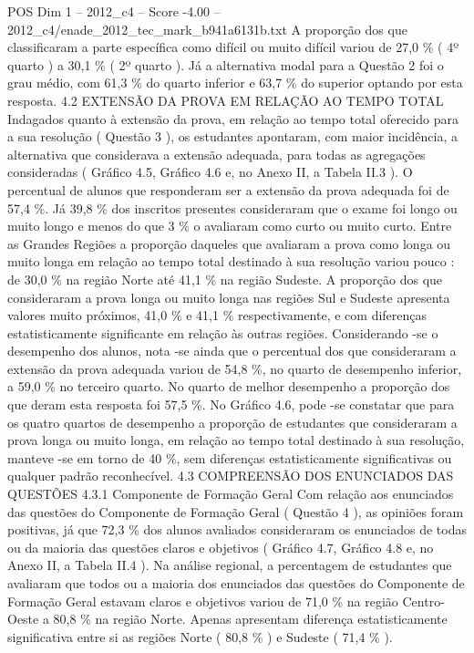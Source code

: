 \begin{textsample}{POS Dim 1 – 2012\_c4 – Score -4.00 – 2012\_c4/enade\_2012\_tec\_mark\_b941a6131b.txt}
A proporção dos que classificaram a parte específica como difícil ou muito difícil variou de 27,0 \% ( 4º quarto ) a 30,1 \% ( 2º quarto ).
Já a alternativa modal para a Questão 2 foi o grau médio, com 61,3 \% do quarto inferior e 63,7 \% do superior optando por esta resposta. 4.2 EXTENSÃO DA PROVA EM RELAÇÃO AO TEMPO TOTAL Indagados quanto à extensão da prova, em relação ao tempo total oferecido para a sua resolução ( Questão 3 ), os estudantes apontaram, com maior incidência, a alternativa que considerava a extensão adequada, para todas as agregações consideradas ( Gráfico 4.5, Gráfico 4.6 e, no Anexo II, a Tabela II.3 ).
O percentual de alunos que responderam ser a extensão da prova adequada foi de 57,4 \%.
Já 39,8 \% dos inscritos presentes consideraram que o exame foi longo ou muito longo e menos do que 3 \% o avaliaram como curto ou muito curto.
Entre as Grandes Regiões a proporção daqueles que avaliaram a prova como longa ou muito longa em relação ao tempo total destinado à sua resolução variou pouco : de 30,0 \% na região Norte até 41,1 \% na região Sudeste.
A proporção dos que consideraram a prova longa ou muito longa nas regiões Sul e Sudeste apresenta valores muito próximos, 41,0 \% e 41,1 \% respectivamente, e com diferenças estatisticamente significante em relação às outras regiões.
Considerando -se o desempenho dos alunos, nota -se ainda que o percentual dos que consideraram a extensão da prova adequada variou de 54,8 \%, no quarto de desempenho inferior, a 59,0 \% no terceiro quarto.
No quarto de melhor desempenho a proporção dos que deram esta resposta foi 57,5 \%.
No Gráfico 4.6, pode -se constatar que para os quatro quartos de desempenho a proporção de estudantes que consideraram a prova longa ou muito longa, em relação ao tempo total destinado à sua resolução, manteve -se em torno de 40 \%, sem diferenças estatisticamente significativas ou qualquer padrão reconhecível. 4.3 COMPREENSÃO DOS ENUNCIADOS DAS QUESTÕES 4.3.1 Componente de Formação Geral Com relação aos enunciados das questões do Componente de Formação Geral ( Questão 4 ), as opiniões foram positivas, já que 72,3 \% dos alunos avaliados consideraram os enunciados de todas ou da maioria das questões claros e objetivos ( Gráfico 4.7, Gráfico 4.8 e, no Anexo II, a Tabela II.4 ).
Na análise regional, a percentagem de estudantes que avaliaram que todos ou a maioria dos enunciados das questões do Componente de Formação Geral estavam claros e objetivos variou de 71,0 \% na região Centro-Oeste a 80,8 \% na região Norte.
Apenas apresentam diferença estatisticamente significativa entre si as regiões Norte ( 80,8 \% ) e Sudeste ( 71,4 \% ).

\end{textsample}
